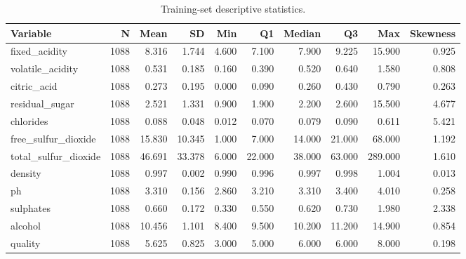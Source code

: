 \begin{table}

\caption{\label{tab:p2-descriptive-statistics}Training-set descriptive statistics.}
\centering
\begin{tabular}[t]{lrrrrrrrrr}
\toprule
Variable & N & Mean & SD & Min & Q1 & Median & Q3 & Max & Skewness\\
\midrule
fixed\_acidity & 1088 & 8.316 & 1.744 & 4.600 & 7.100 & 7.900 & 9.225 & 15.900 & 0.925\\
volatile\_acidity & 1088 & 0.531 & 0.185 & 0.160 & 0.390 & 0.520 & 0.640 & 1.580 & 0.808\\
citric\_acid & 1088 & 0.273 & 0.195 & 0.000 & 0.090 & 0.260 & 0.430 & 0.790 & 0.263\\
residual\_sugar & 1088 & 2.521 & 1.331 & 0.900 & 1.900 & 2.200 & 2.600 & 15.500 & 4.677\\
chlorides & 1088 & 0.088 & 0.048 & 0.012 & 0.070 & 0.079 & 0.090 & 0.611 & 5.421\\
\addlinespace
free\_sulfur\_dioxide & 1088 & 15.830 & 10.345 & 1.000 & 7.000 & 14.000 & 21.000 & 68.000 & 1.192\\
total\_sulfur\_dioxide & 1088 & 46.691 & 33.378 & 6.000 & 22.000 & 38.000 & 63.000 & 289.000 & 1.610\\
density & 1088 & 0.997 & 0.002 & 0.990 & 0.996 & 0.997 & 0.998 & 1.004 & 0.013\\
ph & 1088 & 3.310 & 0.156 & 2.860 & 3.210 & 3.310 & 3.400 & 4.010 & 0.258\\
sulphates & 1088 & 0.660 & 0.172 & 0.330 & 0.550 & 0.620 & 0.730 & 1.980 & 2.338\\
\addlinespace
alcohol & 1088 & 10.456 & 1.101 & 8.400 & 9.500 & 10.200 & 11.200 & 14.900 & 0.854\\
quality & 1088 & 5.625 & 0.825 & 3.000 & 5.000 & 6.000 & 6.000 & 8.000 & 0.198\\
\bottomrule
\end{tabular}
\end{table}
